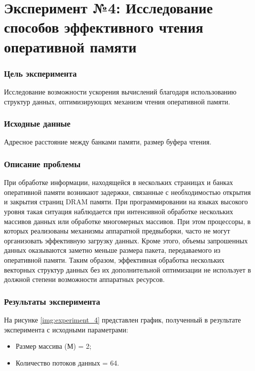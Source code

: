 \chapter*{\textbf{Эксперимент №4: Исследование способов эффективного чтения оперативной памяти}}

\subsection*{\textbf{Цель эксперимента}}
Исследование возможности ускорения вычислений благодаря использованию структур данных, оптимизирующих механизм чтения оперативной памяти.

\subsection*{\textbf{Исходные данные}}
Адресное расстояние между банками памяти, размер буфера чтения.

\subsection*{\textbf{Описание проблемы}}
При обработке информации, находящейся в нескольких страницах и банках оперативной памяти возникают задержки, связанные с необходимостью открытия и закрытия страниц DRAM памяти. При программировании на языках высокого уровня такая ситуация наблюдается при интенсивной обработке нескольких массивов данных или обработке многомерных массивов. При этом процессоры, в которых реализованы механизмы аппаратной предвыборки, часто не могут организовать эффективную загрузку данных. Кроме этого, объемы запрошенных данных оказываются заметно меньше размера пакета, передаваемого из оперативной памяти. Таким образом, эффективная обработка нескольких векторных структур данных без их дополнительной оптимизации не использует в должной степени возможности аппаратных ресурсов. 

\subsection*{\textbf{Результаты эксперимента}}
На рисунке \ref{img:experiment_4} представлен график, полученный в результате эксперимента с исходными параметрами:
\begin{itemize}
	\item Размер массива (М) = 2;
	\item Количество потоков данных = 64.
\end{itemize}

